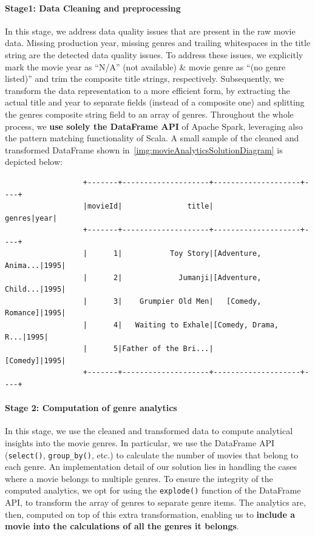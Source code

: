 \documentclass[acmlarge]{acmart}
\begin{document}
  \paragraph{Stage1: Data Cleaning and preprocessing} In this stage, we address data quality issues that are present in the raw movie data. Missing production year, missing genres and trailing whitespaces in the title string are the detected data quality issues. To address these issues, we explicitly mark the movie year as ``N/A'' (not available) \& movie genre as ``(no genre listed)'' and trim the composite title strings, respectively. Subsequently, we transform the data representation to a more efficient form, by extracting the actual title and year to separate fields (instead of a composite one) and splitting the genres composite string field to an array of genres. Throughout the whole process, we \textbf{use solely the DataFrame API} of Apache Spark, leveraging also the pattern matching functionality of Scala. A small sample of the cleaned and transformed DataFrame shown in~\autoref{img:movieAnalyticsSolutionDiagram} is depicted below:

  \begin{verbatim}
                  +-------+--------------------+--------------------+----+
                  |movieId|               title|              genres|year|
                  +-------+--------------------+--------------------+----+
                  |      1|           Toy Story|[Adventure, Anima...|1995|
                  |      2|             Jumanji|[Adventure, Child...|1995|
                  |      3|    Grumpier Old Men|   [Comedy, Romance]|1995|
                  |      4|   Waiting to Exhale|[Comedy, Drama, R...|1995|
                  |      5|Father of the Bri...|            [Comedy]|1995|
                  +-------+--------------------+--------------------+----+
  \end{verbatim}

  \paragraph{Stage 2: Computation of genre analytics} In this stage, we use the cleaned and transformed data to compute analytical insights into the movie genres. In particular, we use the DataFrame API (\texttt{select()}, \texttt{group\_by()}, etc.) to calculate the number of movies that belong to each genre. An implementation detail of our solution lies in handling the cases where a movie belongs to multiple genres. To ensure the integrity of the computed analytics, we opt for using the \texttt{explode()} function of the DataFrame API, to transform the array of genres to separate genre items. The analytics are, then, computed on top of this extra transformation, enabling us to \textbf{include a movie into the calculations of all the genres it belongs}.
\end{document}

